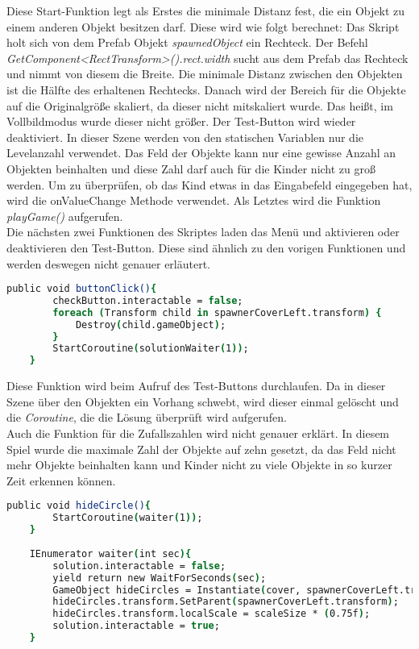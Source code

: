 Diese Start-Funktion legt als Erstes die minimale Distanz fest, die ein Objekt zu einem anderen Objekt besitzen darf. Diese wird wie folgt berechnet: Das Skript holt sich von dem Prefab Objekt \textit{spawnedObject} ein Rechteck. Der Befehl \textit{GetComponent<RectTransform>().rect.width} sucht aus dem Prefab das Rechteck und nimmt von diesem die Breite. Die minimale Distanz zwischen den Objekten ist die Hälfte des erhaltenen Rechtecks. Danach wird der Bereich für die Objekte auf die Originalgröße skaliert, da dieser nicht mitskaliert wurde. Das heißt, im Vollbildmodus wurde dieser nicht größer. Der Test-Button wird wieder deaktiviert. In dieser Szene werden von den statischen Variablen nur die Levelanzahl verwendet. Das Feld der Objekte kann nur eine gewisse Anzahl an Objekten beinhalten und diese Zahl darf auch für die Kinder nicht zu groß werden. Um zu überprüfen, ob das Kind etwas in das Eingabefeld eingegeben hat, wird die onValueChange Methode verwendet. Als Letztes wird die Funktion \textit{playGame()} aufgerufen.\\
Die nächsten zwei Funktionen des Skriptes laden das Menü und aktivieren oder deaktivieren den Test-Button. Diese sind ähnlich zu den vorigen Funktionen und werden deswegen nicht genauer erläutert.\\
\begin{lstlisting}[language=csh, caption={lightningView.cs buttonClick-Funktion}]
	public void buttonClick(){
		checkButton.interactable = false;
		foreach (Transform child in spawnerCoverLeft.transform) {
			Destroy(child.gameObject);
		}
		StartCoroutine(solutionWaiter(1));
	}
\end{lstlisting}
Diese Funktion wird beim Aufruf des Test-Buttons durchlaufen. Da in dieser Szene über den Objekten ein Vorhang schwebt, wird dieser einmal gelöscht und die \textit{Coroutine}, die die Lösung überprüft wird aufgerufen.\\
Auch die Funktion für die Zufallszahlen wird nicht genauer erklärt. In diesem Spiel wurde die maximale Zahl der Objekte auf zehn gesetzt, da das Feld nicht mehr Objekte beinhalten kann und Kinder nicht zu viele Objekte in so kurzer Zeit erkennen können.\\
\begin{lstlisting}[language=csh, caption={hideCircle.cs buttonClick-Funktion}]
	public void hideCircle(){
		StartCoroutine(waiter(1));
	}
	
	IEnumerator waiter(int sec){
		solution.interactable = false;
		yield return new WaitForSeconds(sec);
		GameObject hideCircles = Instantiate(cover, spawnerCoverLeft.transform.position, Quaternion.identity);
		hideCircles.transform.SetParent(spawnerCoverLeft.transform);
		hideCircles.transform.localScale = scaleSize * (0.75f);
		solution.interactable = true;
	}
\end{lstlisting}
